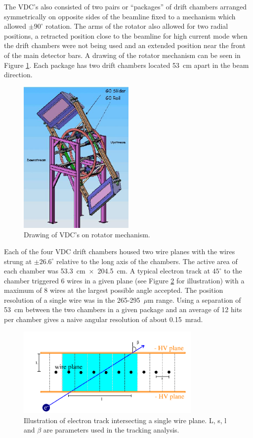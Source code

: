 The VDC's also consisted of two pairs or ``packages'' of drift chambers arranged symmetrically on opposite sides of the beamline fixed to a mechanism which allowed $\pm90^{\circ}$ rotation. The arms of the rotator also allowed for two radial positions, a retracted position close to the beamline for high current mode when the drift chambers were not being used and an extended position near the front of the main detector bars. A drawing of the rotator mechanism can be seen in Figure \ref{fig:VDC_rotator}. Each package has two drift chambers located 53~cm apart in the beam direction.

\begin{figure}[ht]
\centering
\includegraphics[width=0.5\textwidth]{Pictures/VDC_rotator.png}
\caption{Drawing of VDC's on rotator mechanism.}
\label{fig:VDC_rotator}
\end{figure}

Each of the four VDC drift chambers housed two wire planes with the wires strung at $\pm26.6^{\circ}$ relative to the long axis of the chambers. The active area of each chamber was 53.3~cm~$\times$~204.5~cm. A typical electron track at $45^{\circ}$ to the chamber triggered 6 wires in a given plane (see Figure \ref{fig:VDC_track} for illustration) with a maximum of 8 wires at the largest possible angle accepted. The position resolution of a single wire was in the 265-295~$\mu$m range. Using a separation of 53~cm between the two chambers in a given package and an average of 12 hits per chamber gives a naive angular resolution of about 0.15~mrad.
\begin{figure}[ht]
\centering
\includegraphics[width=0.8\textwidth]{Pictures/electron_track.png}
\caption{Illustration of electron track intersecting a single wire plane. L, s, l and $\beta$ are parameters used in the tracking analysis. }
\label{fig:VDC_track}
\end{figure}

